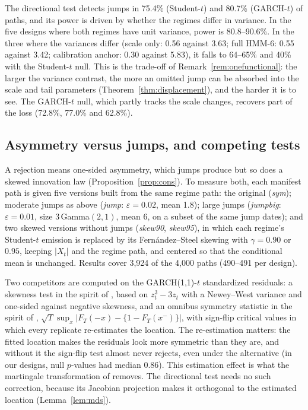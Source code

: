 \documentclass[11pt,a4paper]{article}
\theoremstyle{definition}
\theoremstyle{remark}
\begin{document}
The directional test detects jumps in 75.4\% (Student-$t$) and 80.7\% (GARCH-$t$) of paths, and its power is driven by whether the regimes differ in variance. In the five designs where both regimes have unit variance, power is 80.8--90.6\%. In the three where the variances differ (scale only: 0.56 against 3.63; full HMM-6: 0.55 against 3.42; calibration anchor: 0.30 against 5.83), it falls to 64--65\% and 40\% with the Student-$t$ null. This is the trade-off of Remark~\ref{rem:onefunctional}: the larger the variance contrast, the more an omitted jump can be absorbed into the scale and tail parameters (Theorem~\ref{thm:displacement}), and the harder it is to see. The GARCH-$t$ null, which partly tracks the scale changes, recovers part of the loss (72.8\%, 77.0\% and 62.8\%).

\subsection{Asymmetry versus jumps, and competing tests}\label{sec:b12}
A rejection means one-sided asymmetry, which jumps produce but so does a skewed innovation law (Proposition~\ref{prop:cons}). To measure both, each manifest path is given five versions built from the same regime path: the original (\emph{sym}); moderate jumps as above (\emph{jump}: $\varepsilon=0.02$, mean 1.8); large jumps (\emph{jumpbig}: $\varepsilon=0.01$, size $3\,$Gamma$(2,1)$, mean 6, on a subset of the same jump dates); and two skewed versions without jumps (\emph{skew90}, \emph{skew95}), in which each regime's Student-$t$ emission is replaced by its Fern\'andez--Steel skewing \citep{fernandez1998} with $\gamma=0.90$ or $0.95$, keeping $|X_t|$ and the regime path, and centered so that the conditional mean is unchanged. Results cover 3{,}924 of the 4{,}000 paths (490--491 per design).

Two competitors are computed on the GARCH(1,1)-$t$ standardized residuals: a skewness test in the spirit of \citet{bainh2005}, based on $z_t^3-3z_t$ with a Newey--West variance and one-sided against negative skewness, and an omnibus symmetry statistic in the spirit of \citet{bainh2001}, $\sqrt T\sup_x|F_T(-x)-\{1-F_T(x^-)\}|$, with sign-flip critical values in which every replicate re-estimates the location. The re-estimation matters: the fitted location makes the residuals look more symmetric than they are, and without it the sign-flip test almost never rejects, even under the alternative (in our designs, null $p$-values had median 0.86). This estimation effect is what the martingale transformation of \citet{bainh2001} removes. The directional test needs no such correction, because its Jacobian projection makes it orthogonal to the estimated location (Lemma~\ref{lem:mds}).
\end{document}
